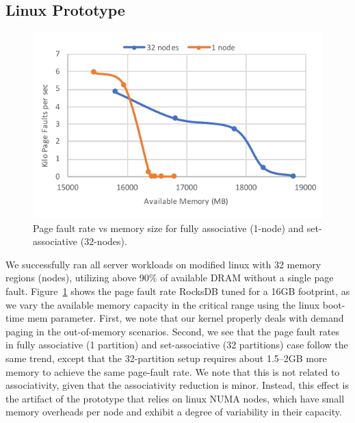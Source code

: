 \subsection{Linux Prototype}
\begin{figure}[t]
   \centering
   \includegraphics[width=1.0\columnwidth]{graphs/realhw.pdf}
   \caption{Page fault rate vs memory size for fully associative (1-node) and set-associative (32-nodes).}
   \label{fig:realhw}
\end{figure}


We successfully ran all server workloads on modified linux with 32 memory regions (nodes), utilizing above 90\% of available DRAM without a single page fault. Figure~\ref{fig:realhw} shows the page fault rate RocksDB tuned for a 16GB footprint, as we vary the available memory capacity in the critical range using the linux boot-time mem parameter. First, we note that our kernel properly deals with demand paging in the out-of-memory scenarios. Second, we see that the page fault rates in fully associative (1 partition) and set-associative (32 partitions) case follow the same trend, except that the 32-partition setup requires about 1.5--2GB more memory to achieve the same page-fault rate. We note that this is not related to associativity, given that the associativity reduction is minor. Instead, this effect is the artifact of the prototype that relies on linux NUMA nodes, which have small memory overheads per node and exhibit a degree of variability in their capacity. 

